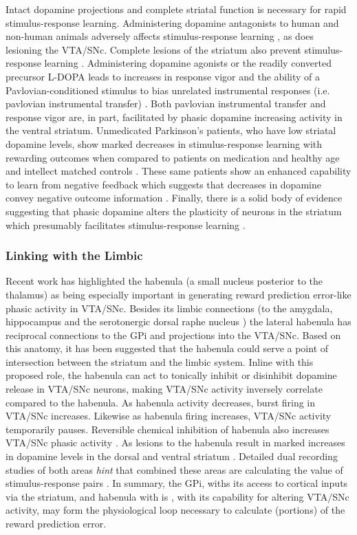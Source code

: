 \documentclass[doc,12pt]{apa}        %
\begin{document}
Intact dopamine projections and complete striatal function is necessary for rapid stimulus-response learning.  Administering dopamine antagonists to human and non-human animals adversely affects stimulus-response learning \cite{Pizzagalli:2010p7205}, as does lesioning the VTA/SNc.  Complete lesions of the striatum also prevent stimulus-response learning \cite{Packard:2002p5074}.  Administering dopamine agonists or the readily converted precursor L-DOPA leads to increases in response vigor and the ability of a Pavlovian-conditioned stimulus to bias unrelated instrumental responses (i.e. pavlovian instrumental transfer) \cite{Winterbauer:2007p6352}. Both pavlovian instrumental transfer and response vigor are, in part, facilitated by phasic dopamine increasing activity in the ventral striatum.  Unmedicated Parkinson's patients, who have low striatal dopamine levels, show marked decreases in stimulus-response learning with rewarding outcomes when compared to patients on medication and healthy age and intellect matched controls \cite{Pizzagalli:2010p7205}.  These same patients show an enhanced capability to learn from negative feedback which suggests that decreases in dopamine convey negative outcome information \cite{Frank:2004p4709}.  Finally, there is a solid body of evidence suggesting that phasic dopamine alters the plasticity of neurons in the striatum which presumably facilitates stimulus-response learning \cite{Calabresi:2007p4284}.

\subsubsection{Linking with the Limbic}
\label{sub:limbic_inte}
Recent work has highlighted the habenula (a small nucleus posterior to the thalamus) as being especially important in generating reward prediction error-like phasic activity in VTA/SNc.  Besides its limbic connections (to the amygdala, hippocampus and the serotonergic dorsal raphe nucleus \cite{Hikosaka:2008p4455}) the lateral habenula has reciprocal connections to the GPi and projections into the VTA/SNc.  Based on this anatomy, it has been suggested that the habenula could serve a point of intersection between the striatum and the limbic system.  Inline with this proposed role, the habenula can act to tonically inhibit or disinhibit dopamine release in VTA/SNc neurons, making VTA/SNc activity inversely correlate compared to the habenula.  As habenula activity decreases, burst firing in VTA/SNc increases.  Likewise as habenula firing increases, VTA/SNc activity temporarily pauses.  Reversible chemical inhibition of habenula also increases VTA/SNc phasic activity \cite{Hikosaka:2008p4455}.  As lesions to the habenula result in marked increases in dopamine levels in the dorsal and ventral striatum \cite{BrombergMartin:2010p7221}.  Detailed dual recording studies of both areas \emph{hint} that combined these areas are calculating the value of stimulus-response pairs \cite{BrombergMartin:2010p7221}.  In summary, the GPi, withs its access to cortical inputs via the striatum, and habenula with is , with its capability for altering VTA/SNc activity, may form the physiological loop necessary to calculate (portions) of the reward prediction error.
\end{document}

